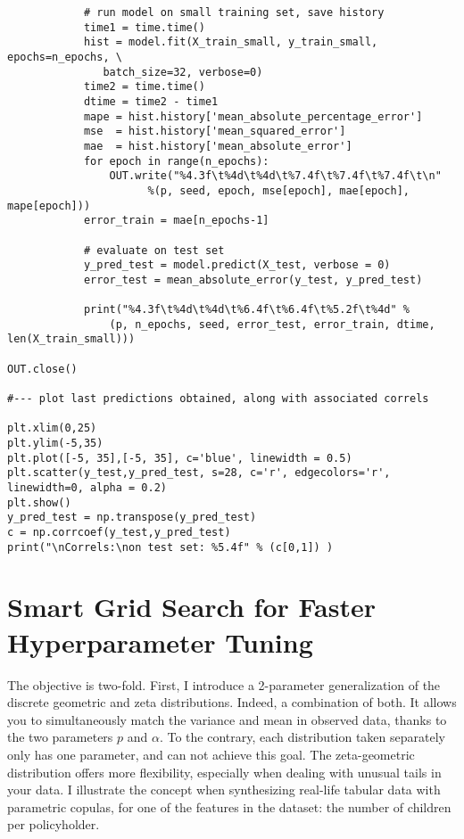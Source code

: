 \documentclass[oneside,10pt]{book}
\begin{document}
\begin{lstlisting}
            # run model on small training set, save history
            time1 = time.time()                   
            hist = model.fit(X_train_small, y_train_small, epochs=n_epochs, \
               batch_size=32, verbose=0)
            time2 = time.time()
            dtime = time2 - time1
            mape = hist.history['mean_absolute_percentage_error'] 
            mse  = hist.history['mean_squared_error']
            mae  = hist.history['mean_absolute_error']
            for epoch in range(n_epochs): 
                OUT.write("%4.3f\t%4d\t%4d\t%7.4f\t%7.4f\t%7.4f\t\n" 
                      %(p, seed, epoch, mse[epoch], mae[epoch], mape[epoch]))
            error_train = mae[n_epochs-1]

            # evaluate on test set
            y_pred_test = model.predict(X_test, verbose = 0)
            error_test = mean_absolute_error(y_test, y_pred_test)

            print("%4.3f\t%4d\t%4d\t%6.4f\t%6.4f\t%5.2f\t%4d" % 
                (p, n_epochs, seed, error_test, error_train, dtime, len(X_train_small)))

OUT.close()

#--- plot last predictions obtained, along with associated correls

plt.xlim(0,25)
plt.ylim(-5,35)
plt.plot([-5, 35],[-5, 35], c='blue', linewidth = 0.5)
plt.scatter(y_test,y_pred_test, s=28, c='r', edgecolors='r', linewidth=0, alpha = 0.2) 
plt.show()
y_pred_test = np.transpose(y_pred_test)
c = np.corrcoef(y_test,y_pred_test)
print("\nCorrels:\non test set: %5.4f" % (c[0,1]) )        
\end{lstlisting}






\section{Smart Grid Search for Faster Hyperparameter Tuning}\label{smargsxxbv}


The objective is two-fold. First, I introduce a 2-parameter generalization of the discrete geometric and zeta distributions. 
Indeed, a combination of both. It allows you to simultaneously match the variance and mean in observed data, thanks to the two
 parameters $p$ and $\alpha$. To the contrary, each distribution taken separately only has one parameter, and can not achieve this goal. The zeta-geometric distribution offers more flexibility, especially when dealing with 
 unusual tails in your data. I illustrate the concept when synthesizing real-life tabular data with parametric copulas, for one of the features 
 in the dataset: the number of children per policyholder.  
\end{document}
